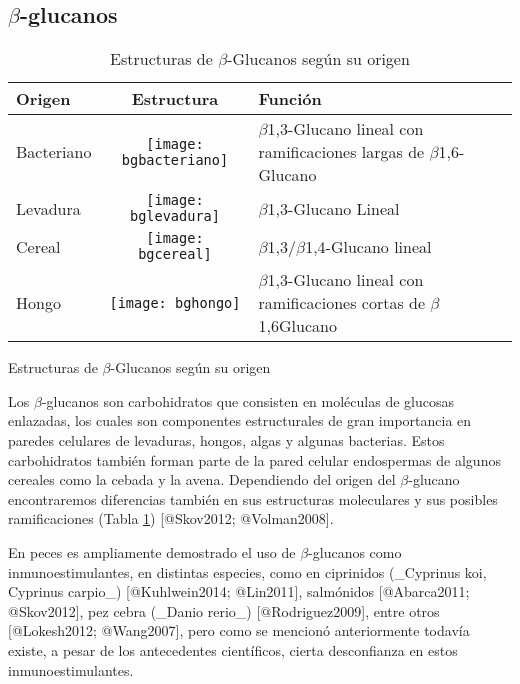 \subsection{$\beta$-glucanos}

\begin{table}[h!]
	\sffamily
	\begin{center}
		\begin{threeparttable}
		\caption{Estructuras de $\beta$-Glucanos según su origen}\label{tablaglucanos}
			\begin{tabularx}{13cm}{l c X}
			\toprule
			\textbf{Origen} & \textbf{Estructura} & \textbf{Función} \\
			\midrule
			Bacteriano & \texttt{[image: bgbacteriano]} & $\beta$1,3-Glucano lineal con ramificaciones largas de $\beta$1,6-Glucano\\
			Levadura & \texttt{[image: bglevadura]} & $\beta$1,3-Glucano Lineal \\ 
			Cereal & \texttt{[image: bgcereal]} & $\beta$1,3/$\beta$1,4-Glucano lineal \\
			Hongo & \texttt{[image: bghongo]} & $\beta$1,3-Glucano lineal con ramificaciones cortas de $\beta$1,6Glucano \\
			\bottomrule
			\end{tabularx}
			\begin{tablenotes}
			\item Estructuras de $\beta$-Glucanos según su origen
			\end{tablenotes}
		\end{threeparttable}
	\end{center}
\end{table}


Los $\beta$-glucanos son carbohidratos que consisten en moléculas de glucosas enlazadas, los cuales son componentes estructurales de gran importancia en paredes celulares de levaduras, hongos, algas y algunas bacterias. Estos carbohidratos también forman parte de la pared celular endospermas de algunos cereales como la cebada y la avena. Dependiendo del origen del $\beta$-glucano encontraremos diferencias también en sus estructuras moleculares y sus posibles ramificaciones (Tabla \ref{tablaglucanos}) [@Skov2012; @Volman2008].

En peces es ampliamente demostrado el uso de $\beta$-glucanos como inmunoestimulantes, en distintas especies, como en ciprinidos (_Cyprinus koi, Cyprinus carpio_) [@Kuhlwein2014; @Lin2011]⁠, salmónidos [@Abarca2011; @Skov2012]⁠, pez cebra (_Danio rerio_) [@Rodriguez2009], entre otros [@Lokesh2012; @Wang2007], pero como se mencionó anteriormente todavía existe, a pesar de los antecedentes científicos, cierta desconfianza en estos inmunoestimulantes. 

